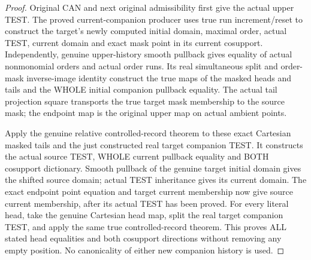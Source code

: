 \begin{proof}
Original CAN and next original admissibility first give the actual upper
TEST. The proved current-companion producer uses true run increment/reset
to construct the target's newly computed initial domain, maximal order,
actual TEST, current domain and exact mask point in its current cosupport.
Independently, genuine upper-history smooth pullback gives equality of
actual nonmonomial orders and actual order runs. Its real simultaneous
split and order-mask inverse-image identity construct the true maps of the
masked heads and tails and the WHOLE initial companion pullback equality.
The actual tail projection square transports the true target mask
membership to the source mask; the endpoint map is the original upper map
on actual ambient points.

Apply the genuine relative controlled-record theorem to these exact
Cartesian masked tails and the just constructed real target companion
TEST. It constructs the actual source TEST, WHOLE current pullback equality
and BOTH cosupport dictionary. Smooth pullback of the genuine target
initial domain gives the shifted source domain; actual TEST inheritance
gives its current domain. The exact endpoint point equation and target
current membership now give source current membership, after its actual
TEST has been proved. For every literal head, take the genuine Cartesian
head map, split the real target companion TEST, and apply the same true
controlled-record theorem. This proves ALL stated head equalities and
both cosupport directions without removing any empty position. No
canonicality of either new companion history is used.
\end{proof}

